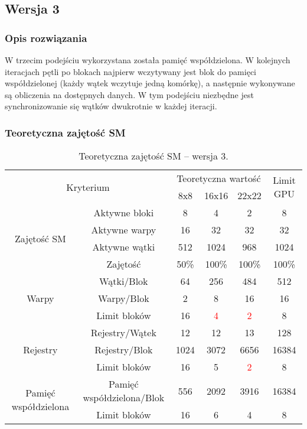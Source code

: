 
\subsection{Wersja 3}

\subsubsection{Opis rozwiązania}

W trzecim podejściu wykorzystana została pamięć współdzielona. W kolejnych iteracjach pętli po blokach najpierw wczytywany jest blok do pamięci współdzielonej (każdy wątek wczytuje jedną komórkę), a następnie wykonywane są obliczenia na dostępnych danych. W tym podejściu niezbędne jest synchronizowanie się wątków dwukrotnie w każdej iteracji.



\subsubsection{Teoretyczna zajętość SM}

\begin{center}
\begin{table}[H]
\centering
\begin{tabular}{|c|c|c|c|c|c|}
\hline
\multicolumn{2}{|c|}{\multirow{2}{*}{Kryterium}} & \multicolumn{3}{c|}{Teoretyczna wartość} & \multirow{2}{*}{Limit GPU} \\ \cline{3-5}
\multicolumn{2}{|c|}{} & 8x8 & 16x16 & 22x22 & \\ \hline
\multirow{4}{*}{Zajętość SM} & Aktywne bloki & 8 & 4 & 2 & 8 \\ \cline{2-6}
& Aktywne warpy & 16 & 32 & 32 & 32 \\ \cline{2-6}
& Aktywne wątki & 512 & 1024 & 968 & 1024 \\ \cline{2-6}
& Zajętość & 50\% & 100\% & 100\% & 100\% \\ \hline
\multirow{3}{*}{Warpy} & Wątki/Blok & 64 & 256 & 484 & 512 \\ \cline{2-6}
& Warpy/Blok & 2 & 8 & 16 & 16 \\ \cline{2-6}
& Limit bloków & 16 & \textcolor{red}{4} & \textcolor{red}{2} & 8 \\ \hline
\multirow{3}{*}{Rejestry} & Rejestry/Wątek & 12 & 12 & 13 & 128 \\ \cline{2-6}
& Rejestry/Blok & 1024 & 3072 & 6656 & 16384 \\ \cline{2-6}
& Limit bloków & 16 & 5 & \textcolor{red}{2} & 8 \\ \hline
\multirow{2}{*}{Pamięć współdzielona} & Pamięć współdzielona/Blok & 556 & 2092 & 3916 & 16384 \\ \cline{2-6}
& Limit bloków & 16 & 6 & 4 & 8 \\ \hline
\end{tabular}
\caption{Teoretyczna zajętość SM -- wersja 3.}
\end{table}
\end{center}

